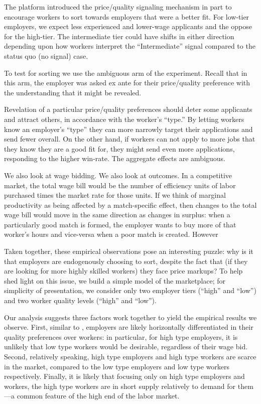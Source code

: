 The platform introduced the price/quality signaling mechanism in part to encourage workers to sort towards employers that were a better fit.
For low-tier employers, we expect less experienced and lower-wage applicants and the oppose for the high-tier.
The intermediate tier could have shifts in either direction depending upon how workers interpret the ``Intermediate'' signal compared to the status quo (no signal) case. 

To test for sorting we use the ambiguous arm of the experiment. 
Recall that in this arm, the employer was asked ex ante for their price/quality preference with the understanding that it might be revealed. 

Revelation of a particular price/quality preferences should deter some applicants and attract others, in accordance with the worker's ``type.'' 
By letting workers know an employer's ``type'' they can more narrowly target their applications and send fewer overall.
On the other hand, if workers can not apply to more jobs that they know they are a good fit for, they might send even more applications, responding to the higher win-rate.
The aggregate effects are ambiguous. 

We also look at wage bidding.
We also look at outcomes. 
In a competitive market, the total wage bill would be the number of efficiency units of labor purchased times the market rate for those units.
If we think of marginal productivity as being affected by a match-specific effect, then changes to the total wage bill would move in the same direction as changes in surplus:
when a particularly good match is formed, the employer wants to buy more of that worker's hours and vice-versa when a poor match is created. 
However



Taken together, these empirical observations pose an interesting puzzle:
why is it that employers are endogenously choosing to sort, despite the fact that (if they are looking for more highly skilled workers) they face price markups?
To help shed light on this issue, we build a simple model of the marketplace; for simplicity of presentation, we consider only two employer tiers (``high'' and ``low'') and two worker quality levels (``high'' and ``low'').

Our analysis suggests three factors work together to yield the empirical results we observe.
First, similar to \cite{tadelis2011information}, employers are likely horizontally differentiated in their quality preferences over workers: in particular, for high type employers, it is unlikely that low type workers would be desirable, regardless of their wage bid.
Second, relatively speaking, high type employers and high type workers are scarce in the market, compared to the low type employers and low type workers respectively.
Finally, it is likely that focusing only on high type employers and workers, the high type workers are in short supply relatively to demand for them---a common feature of the high end of the labor market.


